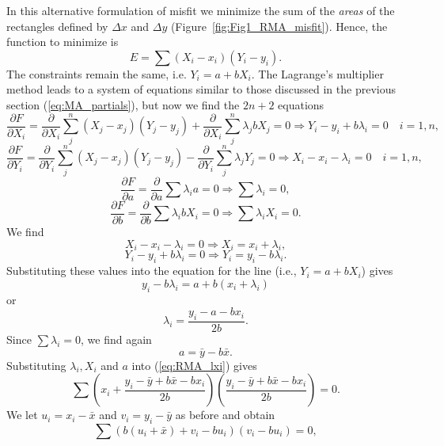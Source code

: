 In this alternative formulation of misfit we minimize the sum of the \emph{areas} of the rectangles defined by $\Delta x$ and $\Delta y$ (Figure~\ref{fig:Fig1_RMA_misfit}).
Hence, the function to minimize is
\begin{equation}
E = \sum (X_i - x_i)(Y_i - y_i).
\label{eq:E_RMA_axis}
\end{equation}
The constraints remain the same, i.e. $Y_i = a + bX_i$.  The Lagrange's multiplier method leads to a 
system of equations similar to those discussed in the previous section (\ref{eq:MA_partials}), but now we find
the $2n + 2$ equations
\begin{equation}
\frac{\partial F}{\partial X_i} = \frac{\partial}{\partial X_i} \sum_j^n (X_j - x_j)(Y_j - y_j) + \frac{\partial}{\partial X_i} \sum_j^n \lambda_j b X_j = 0 \Rightarrow Y_i - y_i + b \lambda_i = 0  \quad i = 1,n,
\end{equation}	 	
\begin{equation}
\frac{\partial F}{\partial Y_i} = \frac{\partial}{\partial Y_i} \sum_j^n (X_j - x_j)(Y_j - y_j) - \frac{\partial}{\partial Y_i} \sum_j^n \lambda_j Y_j = 0 \Rightarrow X_i - x_i - \lambda_i = 0 \quad i = 1,n,
\end{equation}
\begin{equation}
\frac{\partial F}{\partial a} = \frac{\partial}{\partial a} \sum \lambda_i a = 0 \Rightarrow \sum \lambda_i = 0,
\end{equation}
\begin{equation}
\frac{\partial F}{\partial b} = \frac{\partial}{\partial b} \sum \lambda_i b X_i = 0 \Rightarrow \sum \lambda_i X_i = 0.
\label{eq:RMA_lxi}
\end{equation}
We find     
\begin{equation}
X_i - x_i - \lambda_i = 0 \Rightarrow X_i = x_i + \lambda_i,
\end{equation}
\begin{equation}	           
Y_i - y_i + b \lambda_i = 0 \Rightarrow Y_i = y_i - b\lambda_i.
\end{equation}
Substituting these values into the equation for the line (i.e., $Y_i = a + bX_i$) gives
\begin{equation}
y_i - b \lambda_i = a + b (x_i + \lambda_i)
\end{equation}
or			       
\begin{equation}
\lambda_i = \frac{y_i - a - bx_i}{2b}.
\end{equation}	 
Since $\sum \lambda_i = 0$, we find again
\begin{equation}
a = \bar{y} - b \bar{x}.
\end{equation}	 
Substituting $\lambda_i, X_i$ and $a$ into (\ref{eq:RMA_lxi}) gives
$$
\sum \left ( x_i + \frac{y_i - \bar{y} + b \bar{x} - b x_i}{2b} \right ) \left ( 
\frac{y_i - \bar{y} + b \bar{x} - b x_i}{2b} \right) = 0.
$$
We let $u_i = x_i - \bar{x}$ and $v_i = y_i - \bar{y}$ as before and obtain 
$$
\sum \left (b (u_i + \bar{x} ) + v_i - bu_i \right ) (v_i - bu_i) = 0,
$$

